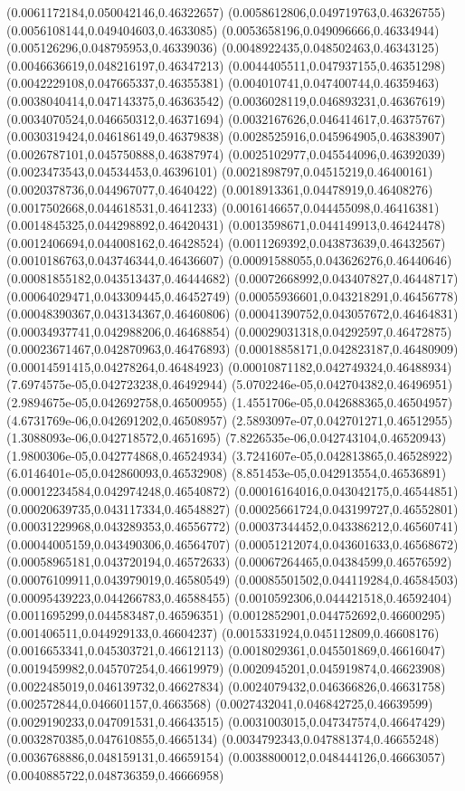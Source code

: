 (0.0061172184,0.050042146,0.46322657) (0.0058612806,0.049719763,0.46326755) (0.0056108144,0.049404603,0.4633085) (0.0053658196,0.049096666,0.46334944) (0.005126296,0.048795953,0.46339036) (0.0048922435,0.048502463,0.46343125) (0.0046636619,0.048216197,0.46347213) (0.0044405511,0.047937155,0.46351298) (0.0042229108,0.047665337,0.46355381) (0.004010741,0.047400744,0.46359463) (0.0038040414,0.047143375,0.46363542) (0.0036028119,0.046893231,0.46367619) (0.0034070524,0.046650312,0.46371694) (0.0032167626,0.046414617,0.46375767) (0.0030319424,0.046186149,0.46379838) (0.0028525916,0.045964905,0.46383907) (0.0026787101,0.045750888,0.46387974) (0.0025102977,0.045544096,0.46392039) (0.0023473543,0.04534453,0.46396101) (0.0021898797,0.04515219,0.46400161) (0.0020378736,0.044967077,0.4640422) (0.0018913361,0.04478919,0.46408276) (0.0017502668,0.044618531,0.4641233) (0.0016146657,0.044455098,0.46416381) (0.0014845325,0.044298892,0.46420431) (0.0013598671,0.044149913,0.46424478) (0.0012406694,0.044008162,0.46428524) (0.0011269392,0.043873639,0.46432567) (0.0010186763,0.043746344,0.46436607) (0.00091588055,0.043626276,0.46440646) (0.00081855182,0.043513437,0.46444682) (0.00072668992,0.043407827,0.46448717) (0.00064029471,0.043309445,0.46452749) (0.00055936601,0.043218291,0.46456778) (0.00048390367,0.043134367,0.46460806) (0.00041390752,0.043057672,0.46464831) (0.00034937741,0.042988206,0.46468854) (0.00029031318,0.04292597,0.46472875) (0.00023671467,0.042870963,0.46476893) (0.00018858171,0.042823187,0.46480909) (0.00014591415,0.04278264,0.46484923) (0.00010871182,0.042749324,0.46488934) (7.6974575e-05,0.042723238,0.46492944) (5.0702246e-05,0.042704382,0.46496951) (2.9894675e-05,0.042692758,0.46500955) (1.4551706e-05,0.042688365,0.46504957) (4.6731769e-06,0.042691202,0.46508957) (2.5893097e-07,0.042701271,0.46512955) (1.3088093e-06,0.042718572,0.4651695) (7.8226535e-06,0.042743104,0.46520943) (1.9800306e-05,0.042774868,0.46524934) (3.7241607e-05,0.042813865,0.46528922) (6.0146401e-05,0.042860093,0.46532908) (8.851453e-05,0.042913554,0.46536891) (0.00012234584,0.042974248,0.46540872) (0.00016164016,0.043042175,0.46544851) (0.00020639735,0.043117334,0.46548827) (0.00025661724,0.043199727,0.46552801) (0.00031229968,0.043289353,0.46556772) (0.00037344452,0.043386212,0.46560741) (0.00044005159,0.043490306,0.46564707) (0.00051212074,0.043601633,0.46568672) (0.00058965181,0.043720194,0.46572633) (0.00067264465,0.04384599,0.46576592) (0.00076109911,0.043979019,0.46580549) (0.00085501502,0.044119284,0.46584503) (0.00095439223,0.044266783,0.46588455) (0.0010592306,0.044421518,0.46592404) (0.0011695299,0.044583487,0.46596351) (0.0012852901,0.044752692,0.46600295) (0.001406511,0.044929133,0.46604237) (0.0015331924,0.045112809,0.46608176) (0.0016653341,0.045303721,0.46612113) (0.0018029361,0.045501869,0.46616047) (0.0019459982,0.045707254,0.46619979) (0.0020945201,0.045919874,0.46623908) (0.0022485019,0.046139732,0.46627834) (0.0024079432,0.046366826,0.46631758) (0.002572844,0.046601157,0.4663568) (0.0027432041,0.046842725,0.46639599) (0.0029190233,0.047091531,0.46643515) (0.0031003015,0.047347574,0.46647429) (0.0032870385,0.047610855,0.4665134) (0.0034792343,0.047881374,0.46655248) (0.0036768886,0.048159131,0.46659154) (0.0038800012,0.048444126,0.46663057) (0.0040885722,0.048736359,0.46666958) 
